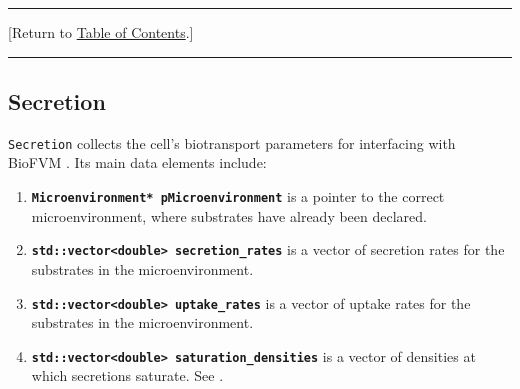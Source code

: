 \documentclass[12pt]{article}
\renewcommand{\vec}[1]{\mathbf{#1}}
\newcommand{\beq}{\begin{equation}}
\newcommand{\eeq}{\end{equation}}
\renewcommand{\v}{\verb}
\newcommand{\smallcode}[1]{\textbf{\texttt{#1}}}
\newcommand{\blue}[1]{\textcolor{blue}{#1}}
\newcommand{\DONE}{}%
\newcommand{\TOClink}{\begin{center}\hrule\vskip-10pt\phantom{.}\hfill[Return to \hyperlink{TOC}{Table of Contents}.]\hfill\phantom{.}\vskip3pt\hrule\end{center}}
\begin{document}
\TOClink

\subsection{Secretion \DONE}
\label{sec:Secretion}
\v|Secretion| collects the cell's biotransport parameters for interfacing with BioFVM \cite{ref:BioFVM}. Its main data elements include:

\begin{enumerate}
\item 
\smallcode{Microenvironment* pMicroenvironment} is a pointer to the correct microenvironment, where substrates have already been declared. 

\item 
\smallcode{std::vector<double> secretion\_rates} is a vector of secretion rates for the substrates in the microenvironment. 

\item 
\smallcode{std::vector<double> uptake\_rates} is a vector of uptake rates for the substrates in the microenvironment. 

\item 
\smallcode{std::vector<double> saturation\_densities} is a vector of densities at which secretions saturate. See \cite{ref:BioFVM}. 
\end{enumerate}
\end{document}
